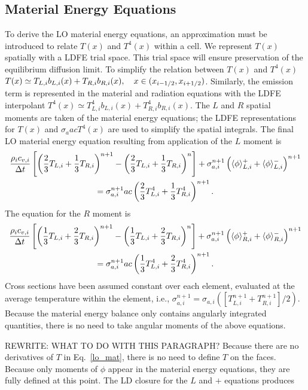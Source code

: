 \subsection{Material Energy Equations}

To derive the LO material energy equations, an approximation must be introduced to relate
$T(x)$ and $T^4(x)$ within a cell.  We represent $T(x)$ spatially 
with a LDFE trial space.  This trial space will ensure preservation of the equilibrium
diffusion limit.  To simplify the relation between $T(x)$ and $T^4(x)$ 
$ T(x) \simeq T_{L,i} b_{L,i}(x) + T_{R,i} b_{R,i}(x),\quad x\in(x_{i-1/2},x_{{i+1/2}})$.
Similarly, the emission term is represented in the material and radiation equations with the LDFE
interpolant $T^4(x)\simeq T_{L,i}^4 b_{L,i}(x) + T_{R,i}^4 b_{R,i}(x)$.   The $L$ and $R$ spatial moments are taken of the material
energy equations; the LDFE representations for $T(x)$ and $\sigma_a a c T^4(x)$ are used to
simplify the spatial integrals. The final LO material energy
 equation resulting from application of the $L$ moment is
 \begin{multline}\label{lo_mat_dis}
     \frac{\rho_i c_{v,i}}{\Delta t}\left[ \left(\frac{2}{3}T_{L,i} + \frac{1}{3}T_{R,i}
        \right)^{n+1} - \left(\frac{2}{3}T_{L,i} + \frac{1}{3}T_{R,i}
    \right)^{n} \right]  + \sigma_{a,i}^{n+1} \left( \langle \phi \rangle_{L,i}^+ +
    \langle \phi \rangle_{L,i}^- \right)^{n+1} \\ = \sigma_{a,i}^{n+1}a c
\left( \frac{2}{3} T_{L,i}^4 + \frac{1}{3}T_{R,i}^4
        \right)^{n+1}.
\end{multline}
The equation for the $R$ moment is
 \begin{multline}\label{lo_mat_dis}
     \frac{\rho_i c_{v,i}}{\Delta t}\left[ \left(\frac{1}{3}T_{L,i} + \frac{2}{3}T_{R,i}
        \right)^{n+1} - \left(\frac{1}{3}T_{L,i} + \frac{2}{3}T_{R,i}
    \right)^{n} \right]  + \sigma_{a,i}^{n+1} \left( \langle \phi \rangle_{R,i}^+ +
    \langle \phi \rangle_{R,i}^- \right)^{n+1} \\ = \sigma_{a,i}^{n+1}a c
\left( \frac{1}{3} T_{L,i}^4 + \frac{2}{3}T_{R,i}^4
        \right)^{n+1}.
\end{multline}
Cross sections have been assumed constant over each element, evaluated at the
average temperature within the element, i.e., $\sigma_{a,i}^{n+1} =
\sigma_{a,i}([T^{n+1}_{L,i}+T^{n+1}_{R,i}]/2)$.
Because the material energy balance
 only contains angularly integrated quantities, there is no need to take angular
 moments of the above equations.  

REWRITE: WHAT TO DO WITH THIS PARAGRAPH?
Because there are no derivatives of $T$ in Eq.~\eqref{lo_mat}, there is no need
to define $T$ on the faces.  Because only moments of $\phi$ appear in the material energy
equations, they are fully defined at this point.  The LD closure for the $L$ and $+$ equations produces


